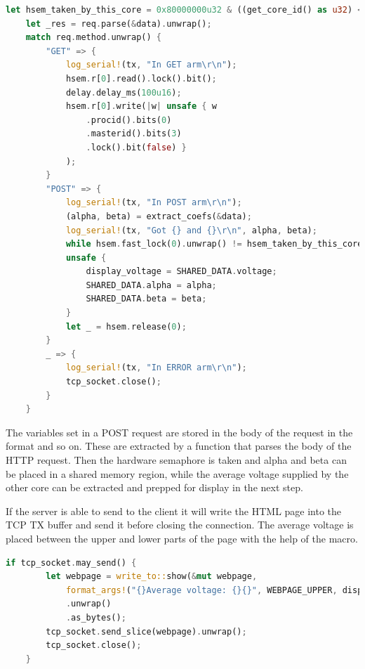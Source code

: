 \begin{lstlisting}[language=Rust,frame=single,float=!ht,style=customrust,label={lst:get-post},caption={Handling of GET and POST requests}]
    let hsem_taken_by_this_core = 0x80000000u32 & ((get_core_id() as u32) << 8);
    let _res = req.parse(&data).unwrap();
    match req.method.unwrap() {
        "GET" => {
            log_serial!(tx, "In GET arm\r\n");
            hsem.r[0].read().lock().bit();
            delay.delay_ms(100u16);
            hsem.r[0].write(|w| unsafe { w
                .procid().bits(0)
                .masterid().bits(3)
                .lock().bit(false) }
            );
        }
        "POST" => {
            log_serial!(tx, "In POST arm\r\n");
            (alpha, beta) = extract_coefs(&data);
            log_serial!(tx, "Got {} and {}\r\n", alpha, beta);
            while hsem.fast_lock(0).unwrap() != hsem_taken_by_this_core {}
            unsafe {
                display_voltage = SHARED_DATA.voltage;
                SHARED_DATA.alpha = alpha;
                SHARED_DATA.beta = beta;
            }
            let _ = hsem.release(0);
        }
        _ => {
            log_serial!(tx, "In ERROR arm\r\n");
            tcp_socket.close();
        }
    }
\end{lstlisting}

The variables set in a POST request are stored in the body of the request in the format  and so on. These are extracted by a function that parses the body of the HTTP request. Then the hardware semaphore is taken and alpha and beta can be placed in a shared memory region, while the average voltage supplied by the other core can be extracted and prepped for display in the next step.

If the server is able to send to the client it will write the HTML page into the TCP TX buffer and send it before closing the connection. The average voltage is placed between the upper and lower parts of the page with the help of the  macro.

\begin{lstlisting}[language=Rust,frame=single,float=!ht,style=customrust,label={lst:may-send},caption={Sending a Response to the Client}]
    if tcp_socket.may_send() {
        let webpage = write_to::show(&mut webpage,
            format_args!("{}Average voltage: {}{}", WEBPAGE_UPPER, display_voltage, WEBPAGE_LOWER))
            .unwrap()
            .as_bytes();
        tcp_socket.send_slice(webpage).unwrap();
        tcp_socket.close();
    }
\end{lstlisting}

